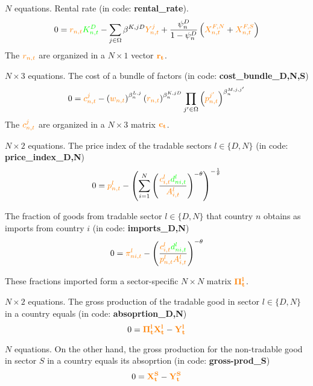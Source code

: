 \documentclass[12pt, bibtotoc, tablecaptionabove, figurecaptionabove, fleqn]{article}
\newcommand{\cl}[1]{{\color{orange}{#1}}}
\newcommand{\st}[1]{{\color{green}{#1}}}
\begin{document}
\noindent $N$ equations. Rental rate  (in code: {\bf{rental\_rate}}). 
\begin{equation}
  0 = \cl{r_{n, t}} \st{K_{n, t}^{D}}-\sum_{j \in \Omega} \beta^{K, j D} \cl{Y_{n, t}^{j}}+\frac{\psi^{D}_n} { 1-\psi^D_n }\left(\cl{X_{n, t}^{F, N}}+\cl{X_{n, t}^{F, S}}\right)
\end{equation}
The $\cl{r_{n,t}}$ are organized in a $ N \times 1$ vector $\mathbf{\cl{r_t}}$.

\noindent $N \times 3$ equations. The cost of a bundle of factors (in code: {\bf{cost\_bundle\_D,N,S}})
\begin{equation}
0 = \cl{c_{n, t}^{j}}-\left(\cl{w_{n, t}}\right)^{\beta_{n}^{L, j}}\left(\cl{r_{n, t}}\right)^{\beta_{n}^{K, j D}} \prod_{j^{\prime} \in \Omega}\left(\cl{p_{n, t}^{j^{\prime}}}\right)^{\beta_{n}^{M, j,j^{\prime}}}
\end{equation}
The $\cl{c^j_{n,t}}$ are organized in a $ N \times 3$ matrix $\mathbf{\cl{c_t}}$.


\noindent $N \times 2$ equations. The price index of the tradable sectors $l \in \{D,N\}$ (in code: {\bf{price\_index\_D,N}})
\begin{equation}
0 = \cl{p^l_{n,t}} - \left(\sum^{N}_{i=1} \left( \frac{\cl{c^l_{i,t}} \st{d^l_{ni,t}}}{\cl{A_{i,t}^l}} \right)^{-\theta} \right)^{-\frac{1}{\theta}}
\end{equation}

The fraction of goods from tradable sector $l \in \{D,N\}$ that country $n$ obtains as imports from country $i$ (in code: {\bf{imports\_D,N}})
\begin{equation}
0 = \cl{\pi^l_{ni,t}} - \left( \frac{\cl{c^l_{i,t}} \st{d^l_{ni,t}}}{\cl{p_{n,t}^l} \cl{A_{i,t}^l}} \right)^{-\theta}
\end{equation}


These fractions imported form a sector-specific $N \times N$ matrix $\mathbf{\cl{\Pi_t^l}}$.

\noindent $N \times 2$ equations. The gross production of the tradable good in sector $l \in \{D,N\}$ in a country equals (in code: {\bf{absoprtion\_D,N}})
\begin{equation}
0 = \mathbf{\cl{\Pi^l_t}}\mathbf{\cl{X^l_t}} -  \mathbf{\cl{Y^l_t}}
\end{equation}

\noindent $N$ equations. On the other hand, the gross production for the non-tradable good in sector $S$ in a country equals its absoprtion (in code: {\bf{gross-prod\_S}})
\begin{equation}
0 = \mathbf{\cl{X^S_t}} -  \mathbf{\cl{Y^S_t}}
\end{equation}
\end{document}
